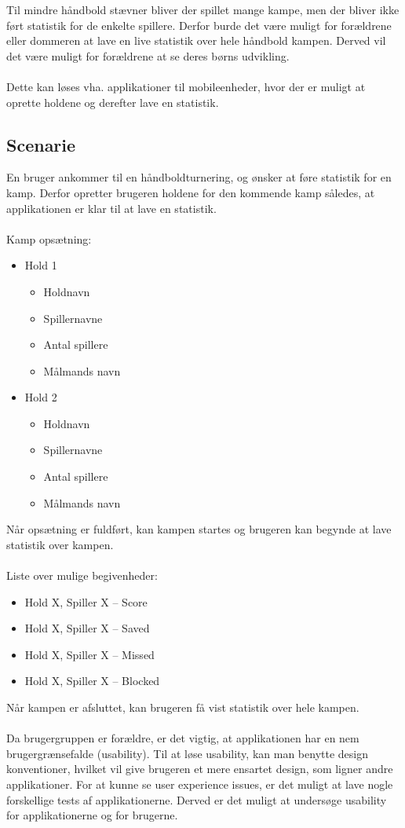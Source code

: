 Til mindre håndbold stævner bliver der spillet mange kampe, men der bliver ikke ført statistik for de enkelte spillere. Derfor burde det være muligt for forældrene eller dommeren at lave en live statistik over hele håndbold kampen. Derved vil det være muligt for forældrene at se deres børns udvikling.\\\\
Dette kan løses vha. applikationer til mobileenheder, hvor der er muligt at oprette holdene og derefter lave en statistik. 

\subsection*{Scenarie}
En bruger ankommer til en håndboldturnering, og ønsker at føre statistik for en kamp. Derfor opretter brugeren holdene for den kommende kamp således, at applikationen er klar til at lave en statistik.\\\\Kamp opsætning:
\begin{itemize}
\item Hold 1
	\begin{itemize}
	\item Holdnavn
	\item Spillernavne
	\item Antal spillere
	\item Målmands navn
	\end{itemize}
\item Hold 2
	\begin{itemize}
	\item Holdnavn
	\item Spillernavne
	\item Antal spillere
	\item Målmands navn\\
	\end{itemize}
\end{itemize}
Når opsætning  er fuldført, kan kampen startes og brugeren kan begynde at lave statistik over kampen.\\\\
Liste over mulige begivenheder:
\begin{itemize}
	\item Hold X, Spiller X – Score
	\item Hold X, Spiller X – Saved
	\item Hold X, Spiller X – Missed
	\item Hold X, Spiller X – Blocked\\
\end{itemize}
Når kampen er afsluttet, kan brugeren få vist statistik over hele kampen.\\\\Da brugergruppen er forældre, er det vigtig, at applikationen har en nem brugergrænsefalde (usability). Til at løse usability, kan man benytte design konventioner, hvilket vil give brugeren et mere ensartet design, som ligner andre applikationer. For at kunne se user experience issues, er det muligt at lave nogle forskellige tests af applikationerne. Derved er det muligt at undersøge usability for applikationerne og for brugerne. 

   
   
